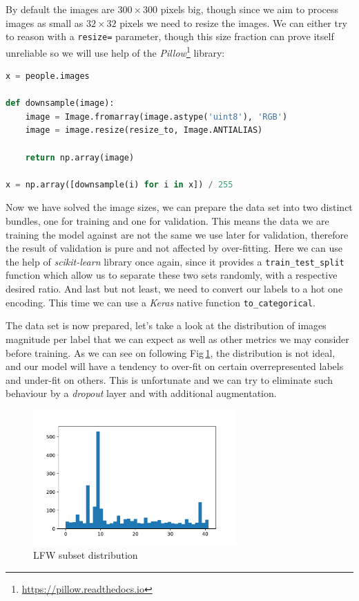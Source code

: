 By default the images are $300\times300$ pixels big, though since we aim to process images as small as $32\times32$ pixels we need to resize the images. We can either try to reason with a \texttt{resize=} parameter, though this size fraction can prove itself unreliable so we will use help of the \textit{Pillow}\footnote{\url{https://pillow.readthedocs.io}} library:

\begin{lstlisting}[language=Python, caption=Pre-processing of the data set]
x = people.images

def downsample(image):
    image = Image.fromarray(image.astype('uint8'), 'RGB')
    image = image.resize(resize_to, Image.ANTIALIAS)

    return np.array(image)

x = np.array([downsample(i) for i in x]) / 255
\end{lstlisting}

Now we have solved the image sizes, we can prepare the data set into two distinct bundles, one for training and one for validation. This means the data we are training the model against are not the same we use later for validation, therefore the result of validation is pure and not affected by over-fitting. Here we can use the help of \textit{scikit-learn} library once again, since it provides a \texttt{train\_test\_split} function which allow us to separate these two sets randomly, with a respective desired ratio. And last but not least, we need to convert our labels to a hot one encoding. This time we can use a \textit{Keras} native function \texttt{to\_categorical}.

The data set is now prepared, let's take a look at the distribution of images magnitude per label that we can expect as well as other metrics we may consider before training. As we can see on following Fig\,\ref{fig:lfw_distribution}, the distribution is not ideal, and our model will have a tendency to over-fit on certain overrepresented labels and under-fit on others. This is unfortunate and we can try to eliminate such behaviour by a \textit{dropout} layer and with additional augmentation.

\begin{figure}[ht]
    \centering
    \includegraphics[height=14em]{obrazky-figures/lfw_distribution.pdf}
    \caption{LFW subset distribution}
    \label{fig:lfw_distribution}
\end{figure}

